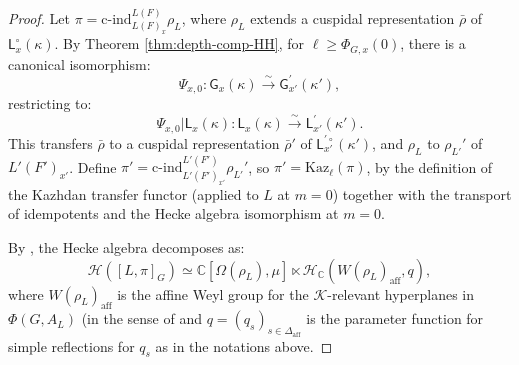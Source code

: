 \documentclass[american]{article}
\numberwithin{equation}{section}
\numberwithin{figure}{section}
\theoremstyle{plain}
\theoremstyle{definition}
\theoremstyle{remark}
\begin{document}
\begin{proof}
Let \(\pi = \text{c-ind}_{L(F)_{x}}^{L(F)} \rho_L\), where \(\rho_L\) extends a cuspidal representation \(\bar{\rho}\) of \(\mathsf{L}_{x}^\circ(\kappa)\). By Theorem \ref{thm:depth-comp-HH}, for \(\ell \geq \Phi_{G,x}(0)\), there is a canonical isomorphism:
\[
\Psi_{x,0} \colon \mathsf{G}_{x}(\kappa) \xrightarrow{\sim} \mathsf{G}_{x'}^{\prime}(\kappa'),
\]
restricting to:
\[
\Psi_{x,0}|\mathsf{L}_{x}(\kappa) \colon \mathsf{L}_{x}(\kappa) \xrightarrow{\sim} \mathsf{L}_{x'}^{\prime}(\kappa').
\]
This transfers \(\bar{\rho}\) to a cuspidal representation \(\bar{\rho}'\) of \(\mathsf{L}_{x'}^{\prime\circ}(\kappa')\), and \(\rho_L\) to \(\rho_{L'}'\) of \(L'(F')_{x'}\). Define \(\pi' = \text{c-ind}_{L'(F')_{x'}}^{L'(F')} \rho_{L'}'\), so \(\pi' = \mathrm{Kaz}_\ell(\pi)\), by the definition of the Kazhdan transfer functor (applied to $L$ at  $m=0$) together with the transport of idempotents and the Hecke algebra isomorphism at $m=0$.

By \cite[Theorem 5.3.6]{AFMO24a}, the Hecke algebra decomposes as:
\[
\mathcal{H}([L, \pi]_G) \simeq \mathbb{C}[\Omega(\rho_L), \mu] \ltimes \mathcal{H}_{\mathbb{C}}(W(\rho_L)_{\text{aff}}, q),
\]
where \(W(\rho_L)_{\text{aff}}\) is the affine Weyl group for the \(\mathcal{K}\)-relevant hyperplanes in \(\Phi(G, A_L)\) (in the sense of \cite[Definition 3.5.6]{AFMO24a} and \(q = (q_s)_{s \in \Delta_{\text{aff}}}\) is the parameter function for simple reflections for \(q_s\) as in the notations above.


\end{proof}
\end{document}
